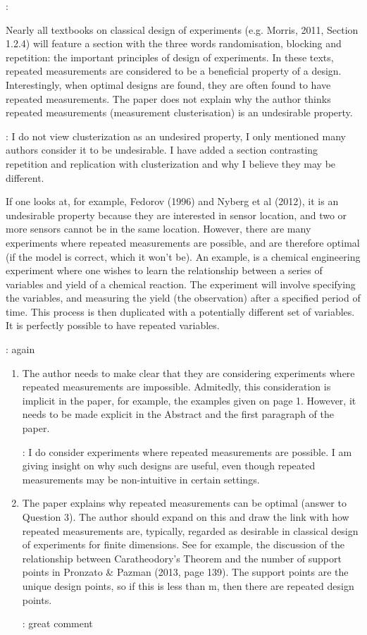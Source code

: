 \documentclass{amsart}
\begin{document}
\answer: 

Nearly all textbooks on classical design of experiments (e.g. Morris,
2011, Section 1.2.4) will feature a section with the three words
randomisation, blocking and repetition: the important principles of
design of experiments.  In these texts, repeated measurements are
considered to be a beneficial property of a design. Interestingly,
when optimal designs are found, they are often found to have repeated
measurements. The paper does not explain why the author thinks
repeated measurements (measurement clusterisation) is an undesirable
property.

\answer: I do not view clusterization as an undesired property, I only
mentioned many authors consider it to be undesirable. I have added a
section contrasting repetition and replication with clusterization and
why I believe they may be different.

If one looks at, for example, Fedorov (1996) and Nyberg et
al (2012), it is an undesirable property because they are interested
in sensor location, and two or more sensors cannot be in the same
location. However, there are many experiments where repeated
measurements are possible, and are therefore optimal (if the model is
correct, which it won’t be). An example, is a chemical engineering
experiment where one wishes to learn the relationship between a series
of variables and yield of a chemical reaction. The experiment will
involve specifying the variables, and measuring the yield (the
observation) after a specified period of time. This process is then
duplicated with a potentially different set of variables.  It is
perfectly possible to have repeated variables.

\answer: again 

\begin{enumerate}
 
\item The author needs to make clear that they are considering
  experiments where repeated measurements are impossible. Admitedly,
  this consideration is implicit in the paper, for example, the
  examples given on page 1. However, it needs to be made explicit in
  the Abstract and the first paragraph of the paper.

  \answer: I do consider experiments where repeated measurements are
  possible. I am giving insight on why such designs are useful, even
  though repeated measurements may be non-intuitive in certain
  settings.
  
\item The paper explains why repeated measurements can be optimal
  (answer to Question 3). The author should expand on this and draw
  the link with how repeated measurements are, typically, regarded as
  desirable in classical design of experiments for finite
  dimensions. See for example, the discussion of the relationship
  between Caratheodory’s Theorem and the number of support points in
  Pronzato \& Pazman (2013, page 139). The support points are the
  unique design points, so if this is less than m, then there are
  repeated design points.

  \answer: great comment
\end{enumerate}
\end{document}

